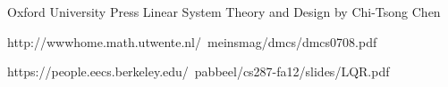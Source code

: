 


Oxford University Press Linear System Theory and Design
by Chi-Tsong Chen

http://wwwhome.math.utwente.nl/~meinsmag/dmcs/dmcs0708.pdf


https://people.eecs.berkeley.edu/~pabbeel/cs287-fa12/slides/LQR.pdf 


